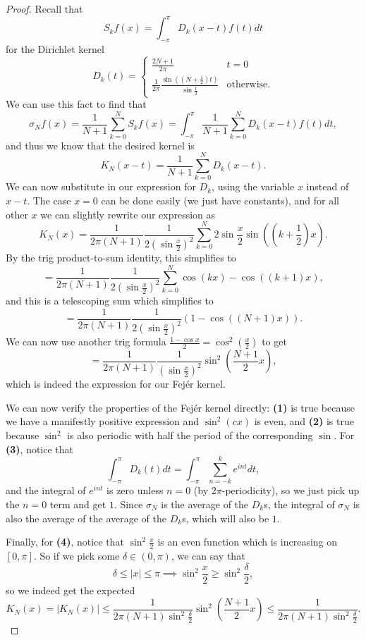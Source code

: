 \begin{proof}
Recall that 
\[
    S_kf(x) = \int_{-\pi}^{\pi} D_k(x-t) f(t) dt
\]
for the Dirichlet kernel 
\[
    D_k(t) = \begin{cases} \frac{2N+1}{2\pi} & t = 0 \\ \frac{1}{2\pi} \frac{\sin\left(\left(N + \frac{1}{2}\right)t\right)}{\sin \frac{t}{2}} & \text{otherwise}. \end{cases}
\]
We can use this fact to find that 
\[
    \sigma_Nf(x) = \frac{1}{N+1} \sum_{k=0}^N S_kf(x) = \int_{-\pi}^{\pi} \frac{1}{N+1} \sum_{k=0}^N D_k(x-t) f(t) dt,
\]
and thus we know that the desired kernel is
\[
    K_N(x-t) = \frac{1}{N+1}\sum_{k=0}^N D_k(x-t).
\]
We can now substitute in our expression for $D_k$, using the variable $x$ instead of $x-t$. The case $x = 0$ can be done easily (we just have constants), and for all other $x$ we can slightly rewrite our expression as
\[
    K_N(x) = \frac{1}{2\pi(N+1)} \frac{1}{2\left(\sin \frac{x}{2}\right)^2} \sum_{k=0}^N 2\sin \frac{x}{2} \sin \left(\left(k + \frac12\right)x\right).
\]
By the trig product-to-sum identity, this simplifies to 
\[
    =  \frac{1}{2\pi(N+1)} \frac{1}{2\left(\sin \frac{x}{2}\right)^2} \sum_{k=0}^N \cos (kx) - \cos \left((k+1)x\right),
\]
and this is a telescoping sum which simplifies to 
\[
    = \frac{1}{2\pi(N+1)} \frac{1}{2\left(\sin \frac{x}{2}\right)^2} \left(1 - \cos((N+1)x)\right).
\]
We can now use another trig formula $\frac{1 - \cos x}{2} = \cos^2\left(\frac{x}{2}\right)$ to get 
\[
    =  \frac{1}{2\pi(N+1)} \frac{1}{\left(\sin \frac{x}{2}\right)^2} \sin^2\left(\frac{N+1}{2}x\right),
\]
which is indeed the expression for our Fej\'er kernel.

We can now verify the properties of the Fej\'er kernel directly: \textbf{(1)} is true because we have a manifestly positive expression and $\sin^2(cx)$ is even, and \textbf{(2)} is true because $\sin^2$ is also periodic with half the period of the corresponding $\sin$. For \textbf{(3)}, notice that 
\[
    \int_{-\pi}^\pi D_k(t) dt = \int_{-\pi}^\pi \sum_{n=-k}^k e^{int} dt,
\]
and the integral of $e^{int}$ is zero unless $n = 0$ (by $2\pi$-periodicity), so we just pick up the $n = 0$ term and get $1$. Since $\sigma_N$ is the average of the $D_k$s, the integral of $\sigma_N$ is also the average of the average of the $D_k$s, which will also be $1$.  

Finally, for \textbf{(4)}, notice that $\sin^2\frac{x}{2}$ is an even function which is increasing on $[0, \pi]$. So if we pick some $\delta \in (0, \pi)$, we can say that 
\[
    \delta \le |x| \le \pi \implies \sin^2\frac{x}{2} \ge \sin^2\frac{\delta}{2},
\]
so we indeed get the expected
\[
    K_N(x) = |K_N(x)| \le \frac{1}{2\pi(N+1) \sin^2\frac{\delta}{2}} \sin^2 \left(\frac{N+1}{2} x\right) \le \frac{1}{2\pi(N+1) \sin^2\frac{\delta}{2}}.
\]
\end{proof}

